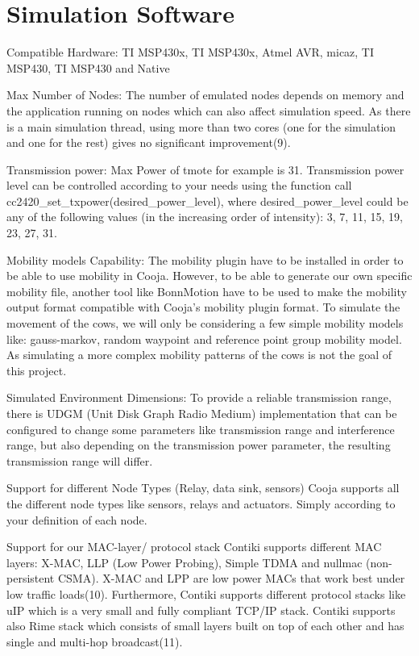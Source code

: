 \documentclass[conference]{IEEEtran}
\begin{document}
\section{Simulation Software}

Compatible Hardware: TI MSP430x,  TI MSP430x, Atmel AVR, micaz, TI MSP430, TI
MSP430 and Native

Max Number of Nodes: The number of emulated nodes depends on memory and the
application running on nodes which can also affect simulation speed. As there
is a main simulation thread, using more than two cores (one for the simulation
and one for the rest) gives no significant improvement(9).

Transmission power: Max Power of tmote for example is 31. Transmission power
level can be controlled according to your needs using the function call
cc2420_set_txpower(desired_power_level), where desired_power_level could be any
of the following values (in the increasing order of intensity): 3, 7, 11, 15,
19, 23, 27, 31.

Mobility models Capability: The mobility plugin have to be installed in order
to be able to use mobility in Cooja. However, to be able to generate our own
specific mobility file, another tool like BonnMotion have to be used to make
the mobility output format compatible with Cooja’s mobility plugin format. To
simulate the movement of the cows, we will only be considering a few simple
mobility models like: gauss-markov, random waypoint and reference point group
mobility model. As simulating a more complex mobility patterns of the cows is
not the goal of this project. ~\cite{contikt_dev}

Simulated Environment Dimensions: To provide a reliable transmission range,
there is UDGM (Unit Disk Graph Radio Medium) implementation that can be
configured to change some parameters like transmission range and interference
range, but also depending on the transmission power parameter, the resulting
transmission range will differ.~\cite{contikt_dev}

Support for different Node Types (Relay, data sink, sensors) Cooja supports all
the different node types like sensors, relays and actuators.  Simply according
to your definition of each node.

Support for our MAC-layer/ protocol stack
Contiki supports different MAC layers: X-MAC, LLP (Low Power Probing), Simple TDMA and nullmac (non-persistent CSMA). X-MAC and LPP are low power MACs that work best under low traffic loads(10).
Furthermore, Contiki supports different protocol stacks like uIP which is a very small and fully compliant TCP/IP stack. Contiki supports also Rime stack which consists of small layers built on top of each other and has single and multi-hop broadcast(11).
\end{document}
